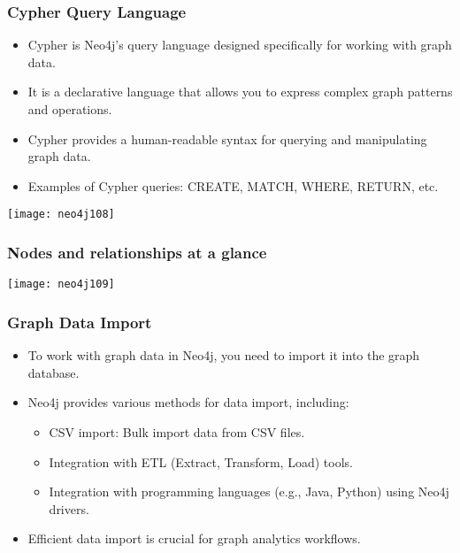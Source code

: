 \begin{frame}[fragile]\frametitle{Cypher Query Language}
  \begin{itemize}
    \item Cypher is Neo4j's query language designed specifically for working with graph data.
    \item It is a declarative language that allows you to express complex graph patterns and operations.
    \item Cypher provides a human-readable syntax for querying and manipulating graph data.
    \item Examples of Cypher queries: CREATE, MATCH, WHERE, RETURN, etc.
  \end{itemize}
  
\begin{center}
\texttt{[image: neo4j108]}
\end{center}	  


\end{frame}

\begin{frame}[fragile]\frametitle{Nodes and relationships at a glance}

\begin{center}
\texttt{[image: neo4j109]}
\end{center}	  


\end{frame}

\begin{frame}[fragile]\frametitle{Graph Data Import}
  \begin{itemize}
    \item To work with graph data in Neo4j, you need to import it into the graph database.
    \item Neo4j provides various methods for data import, including:
    \begin{itemize}
      \item CSV import: Bulk import data from CSV files.
      \item Integration with ETL (Extract, Transform, Load) tools.
      \item Integration with programming languages (e.g., Java, Python) using Neo4j drivers.
    \end{itemize}
    \item Efficient data import is crucial for graph analytics workflows.
  \end{itemize}
\end{frame}

